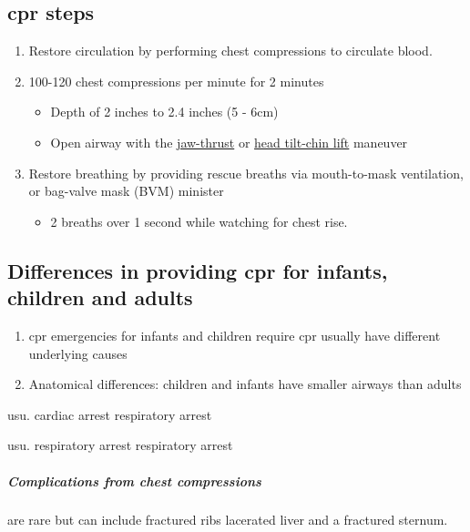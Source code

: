 \documentclass[../../EMT-169.tex]{subfiles}
\begin{document}
\subsection{\acrshort{cpr} steps}
\begin{enumerate}
	\item Restore circulation by performing chest compressions to circulate blood.
	\item 100-120 chest compressions per minute for 2 minutes
	\begin{itemize}
		\item Depth of 2 inches to 2.4 inches (5 - 6cm)
		\item Open airway with the \underline{jaw-thrust} or \underline{head tilt-chin lift} maneuver
	\end{itemize}
	\item Restore breathing by providing rescue breaths via mouth-to-mask ventilation, or bag-valve mask (BVM) minister
	\begin{itemize}
		\item 2 breaths over 1 second while watching for chest rise.
	\end{itemize}
\end{enumerate}

\subsection{Differences in providing \acrshort{cpr} for infants, children and adults}
\begin{enumerate}
	 \item \acrshort{cpr} emergencies for infants and children require \acrshort{cpr} usually have different underlying causes
	 \item Anatomical differences: children and infants have smaller airways than adults
\end{enumerate}

\begin{description}[leftmargin=!,labelwidth=\widthof{\bfseries Children and infants}]
	\item [Adults:] usu. cardiac arrest \textrightarrow  respiratory arrest
	\item [Children \& infants:] usu. respiratory arrest \textrightarrow  respiratory arrest
\end{description}

\subparagraph{Complications from chest compressions} are rare but can include fractured ribs lacerated liver and a fractured sternum.\hfill \\
\end{document}
